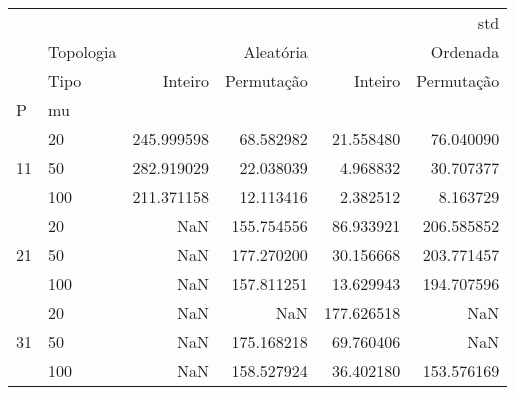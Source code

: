 \begin{tabular}{llrrrr}
\toprule
 &  & \multicolumn{4}{r}{std} \\
 & Topologia & \multicolumn{2}{r}{Aleatória} & \multicolumn{2}{r}{Ordenada} \\
 & Tipo & Inteiro & Permutação & Inteiro & Permutação \\
P & mu &  &  &  &  \\
\midrule
\multirow[t]{3}{*}{11} & 20 & 245.999598 & 68.582982 & 21.558480 & 76.040090 \\
 & 50 & 282.919029 & 22.038039 & 4.968832 & 30.707377 \\
 & 100 & 211.371158 & 12.113416 & 2.382512 & 8.163729 \\
\cline{1-6}
\multirow[t]{3}{*}{21} & 20 & NaN & 155.754556 & 86.933921 & 206.585852 \\
 & 50 & NaN & 177.270200 & 30.156668 & 203.771457 \\
 & 100 & NaN & 157.811251 & 13.629943 & 194.707596 \\
\cline{1-6}
\multirow[t]{3}{*}{31} & 20 & NaN & NaN & 177.626518 & NaN \\
 & 50 & NaN & 175.168218 & 69.760406 & NaN \\
 & 100 & NaN & 158.527924 & 36.402180 & 153.576169 \\
\cline{1-6}
\bottomrule
\end{tabular}
